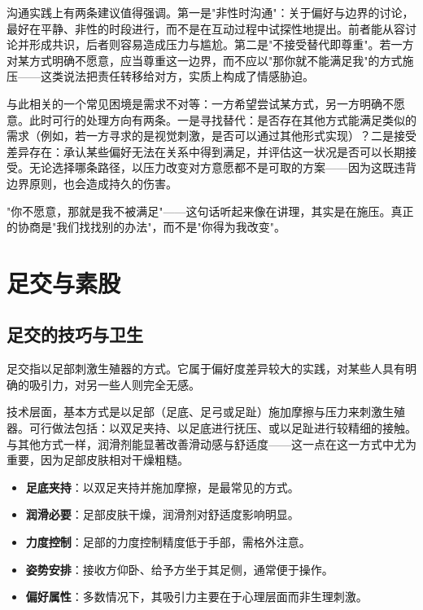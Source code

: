 \documentclass[12pt,UTF8]{ctexbook}
\newcommand{\keyword}[1]{\textbf{#1}}
\begin{document}
沟通实践上有两条建议值得强调。第一是"非性时沟通"：关于偏好与边界的讨论，最好在平静、非性的时段进行，而不是在互动过程中试探性地提出。前者能从容讨论并形成共识，后者则容易造成压力与尴尬。第二是"不接受替代即尊重"。若一方对某方式明确不愿意，应当尊重这一边界，而不应以"那你就不能满足我"的方式施压——这类说法把责任转移给对方，实质上构成了情感胁迫。

与此相关的一个常见困境是需求不对等：一方希望尝试某方式，另一方明确不愿意。此时可行的处理方向有两条。一是寻找替代：是否存在其他方式能满足类似的需求（例如，若一方寻求的是视觉刺激，是否可以通过其他形式实现）？二是接受差异存在：承认某些偏好无法在关系中得到满足，并评估这一状况是否可以长期接受。无论选择哪条路径，以压力改变对方意愿都不是可取的方案——因为这既违背边界原则，也会造成持久的伤害。

\begin{tcolorbox}[colback=pink!5!white,colframe=red!50!black,title=贴心小叮咛]
	"你不愿意，那就是我不被满足"——这句话听起来像在讲理，其实是在施压。真正的协商是"我们找找别的办法"，而不是"你得为我改变"。
\end{tcolorbox}

\section{足交与素股}
\subsection{足交的技巧与卫生}

足交指以足部刺激生殖器的方式。它属于偏好度差异较大的实践，对某些人具有明确的吸引力，对另一些人则完全无感。

技术层面，基本方式是以足部（足底、足弓或足趾）施加摩擦与压力来刺激生殖器。可行做法包括：以双足夹持、以足底进行抚压、或以足趾进行较精细的接触。与其他方式一样，润滑剂能显著改善滑动感与舒适度——这一点在这一方式中尤为重要，因为足部皮肤相对干燥粗糙。

\begin{itemize}
	\item \keyword{足底夹持}：以双足夹持并施加摩擦，是最常见的方式。
	\item \keyword{润滑必要}：足部皮肤干燥，润滑剂对舒适度影响明显。
	\item \keyword{力度控制}：足部的力度控制精度低于手部，需格外注意。
	\item \keyword{姿势安排}：接收方仰卧、给予方坐于其足侧，通常便于操作。
	\item \keyword{偏好属性}：多数情况下，其吸引力主要在于心理层面而非生理刺激。
\end{itemize}
\end{document}
